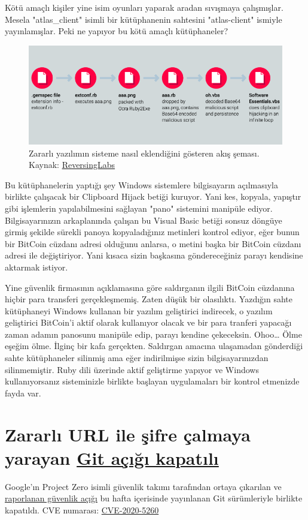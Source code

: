 \documentclass[11pt]{article}
\begin{document}
Kötü amaçlı kişiler yine isim oyunları yaparak aradan sıvışmaya çalışmışlar.
Mesela "atlas\_client" isimli bir kütüphanenin sahtesini "atlas-client" ismiyle
yayınlamışlar. Peki ne yapıyor bu kötü amaçlı kütüphaneler?

\begin{figure}[htbp]
\centering
\includegraphics[width=.9\linewidth]{gorseller/ruby-zararli.png}
\caption{Zararlı yazılımın sisteme nasıl eklendiğini gösteren akış şeması. Kaynak: \href{https://blog.reversinglabs.com/blog/mining-for-malicious-ruby-gems}{ReversingLabs}}
\end{figure}

Bu kütüphanelerin yaptığı şey Windows sistemlere bilgisayarın açılmasıyla
birlikte çalışacak bir Clipboard Hijack betiği kuruyor. Yani kes, kopyala,
yapıştır gibi işlemlerin yapılabilmesini sağlayan "pano" sistemini manipüle
ediyor. Bilgisayarınızın arkaplanında çalışan bu Visual Basic betiği sonsuz
döngüye girmiş şekilde sürekli panoya kopyaladığınız metinleri kontrol ediyor,
eğer bunun bir BitCoin cüzdanı adresi olduğunu anlarsa, o metini başka bir
BitCoin cüzdanı adresi ile değiştiriyor. Yani kısaca sizin başkasına
göndereceğiniz parayı kendisine aktarmak istiyor.

Yine güvenlik firmasının açıklamasına göre saldırganın ilgili BitCoin
cüzdanına hiçbir para transferi gerçekleşmemiş. Zaten düşük bir olasılıktı.
Yazdığın sahte kütüphaneyi Windows kullanan bir yazılım geliştirici indirecek,
o yazılım geliştirici BitCoin'i aktif olarak kullanıyor olacak ve bir para
tranferi yapacağı zaman adamın panosunu manipüle edip, parayı kendine
çekeceksin. Ohoo\ldots{} Ölme eşeğim ölme. İlginç bir kafa gerçekten. Saldırgan
amacına ulaşamadan gönderdiği sahte kütüphaneler silinmiş ama eğer
indirilmişse sizin bilgisayarınızdan silinmemiştir. Ruby dili üzerinde aktif
geliştirme yapıyor ve Windows kullanıyorsanız sisteminizle birlikte başlayan
uygulamaları bir kontrol etmenizde fayda var.
\section{Zararlı URL ile şifre çalmaya yarayan \href{https://github.com/git/git/security/advisories/GHSA-qm7j-c969-7j4q}{Git açığı kapatılı}}
\label{sec:orgc4981c1}
Google'ın Project Zero isimli güvenlik takımı tarafından ortaya çıkarılan ve
\href{https://bugs.chromium.org/p/project-zero/issues/detail?id=2021}{raporlanan güvenlik açığı} bu hafta içerisinde yayınlanan Git sürümleriyle
birlikte kapatıldı. CVE numarası: \href{https://nvd.nist.gov/vuln/detail/CVE-2020-5260}{CVE-2020-5260}
\end{document}
